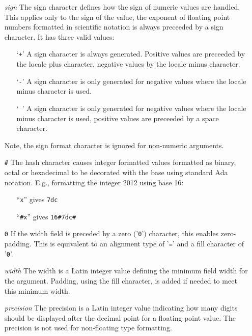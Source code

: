 \begin{itemize}
\item[\textit{sign}]
    The sign character defines how the sign of numeric values are handled.
    This applies only to the sign of the value, the exponent of floating
    point numbers formatted in scientific notation is always preceeded by
    a sign character.  It has three valid values:
    \begin{itemize}
    \item[`\texttt{+}'] A sign character is always generated.  Positive values
        are preceeded by the locale plus character, negative values by the
        locale minus character.
    \item[`\texttt{-}'] A sign character is only generated for negative values
        where the locale minus character is used.
    \item[`\texttt{ }'] A sign character is only generated for negative values
        where the locale minus character is used, positive values are preceeded
        by a space character.
    \end{itemize}
    Note, the sign format character is ignored for non-numeric arguments.

\item[\texttt{\#}]
    The hash character causes integer formatted values formatted as binary,
    octal or hexadecimal to be decorated with the base using standard Ada
    notation.  E.g., formatting the integer 2012 using base 16:
    \begin{itemize}
    \item[``\texttt{x}''] gives \verb|7dc|
    \item[``\texttt{\#x}''] gives \verb|16#7dc#|
    \end{itemize}

\item[\texttt{0}]
    If the width field is preceded by a zero ('\texttt{0}') character, this
    enables zero-padding. This is equivalent to an alignment type of
    '\texttt{=}' and a fill character of '\texttt{0}'.

\item[\textit{width}]
    The width is a Latin integer value defining the minimum field width for
    the argument.  Padding, using the fill character, is added if needed to
    meet this minimum width.

\item[\textit{precision}]
    The precision is a Latin integer value indicating how many digits
    should be displayed after the decimal point for a floating point
    value.  The precision is not used for non-floating type formatting.


\end{itemize}

